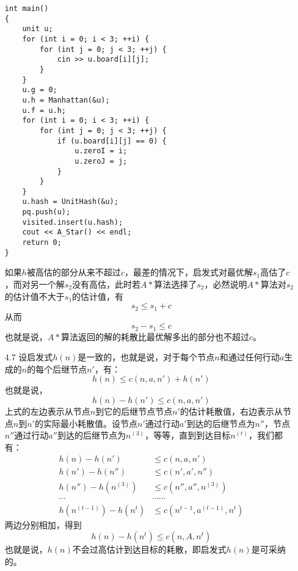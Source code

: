 \documentclass[UTF8,zihao=-4]{ctexart}
\begin{document}
\begin{itemize}
\begin{lstlisting}
int main()
{
    unit u;
    for (int i = 0; i < 3; ++i) {
        for (int j = 0; j < 3; ++j) {
            cin >> u.board[i][j];
        }
    }
    u.g = 0;
    u.h = Manhattan(&u);
    u.f = u.h;
    for (int i = 0; i < 3; ++i) {
        for (int j = 0; j < 3; ++j) {
            if (u.board[i][j] == 0) {
                u.zeroI = i;
                u.zeroJ = j;
            }
        }
    }
    u.hash = UnitHash(&u);
    pq.push(u);
    visited.insert(u.hash);
    cout << A_Star() << endl;
    return 0;
}
		\end{lstlisting}
		如果$h$被高估的部分从来不超过$c$，最差的情况下，启发式对最优解$s_1$高估了$c$，而对另一个解$s_2$没有高估，此时若$A*$算法选择了$s_2$，必然说明$A*$算法对$s_2$的估计值不大于$s_1$的估计值，有
		\begin{equation*}
			s_2 \leq s_1 + c
		\end{equation*}
		从而
		\begin{equation*}
			s_2 - s_1 \leq c
		\end{equation*}
		也就是说，$A*$算法返回的解的耗散比最优解多出的部分也不超过$c$。
		\item[4.7] 设启发式$h(n)$是一致的，也就是说，对于每个节点$n$和通过任何行动$a$生成的$n$的每个后继节点$n'$，有：
		\begin{equation*}
			h(n) \leq c(n, a, n') + h(n')
		\end{equation*} 
		也就是说，
		\begin{equation*}
			h(n) - h(n') \leq c(n, a, n')
		\end{equation*}
		上式的左边表示从节点$n$到它的后继节点节点$n'$的估计耗散值，右边表示从节点$n$到$n'$的实际最小耗散值。设节点$n'$通过行动$a'$到达的后继节点为$n''$，节点$n''$通过行动$a''$到达的后继节点为$n^{(3)}$，等等，直到到达目标$n^{(t)}$，我们都有：
		\begin{align*}
			h(n) - h(n') & \leq c(n, a, n') \\
			h(n') - h(n'') & \leq c(n', a', n'') \\
			h(n'') - h(n^{(3)}) & \leq c(n'', a'', n^{(3)}) \\
			\cdots & \cdots \cdots \\
			h(n^{(t - 1)}) - h(n^{t}) & \leq c(n^{t - 1}, a^{(t - 1)}, n^t)
		\end{align*}
		两边分别相加，得到
		\begin{equation*}
			h(n) - h(n^t) \leq c(n,A,n^t)
		\end{equation*}
		也就是说，$h(n)$不会过高估计到达目标的耗散，即启发式$h(n)$是可采纳的。


\end{itemize}
\end{document}
